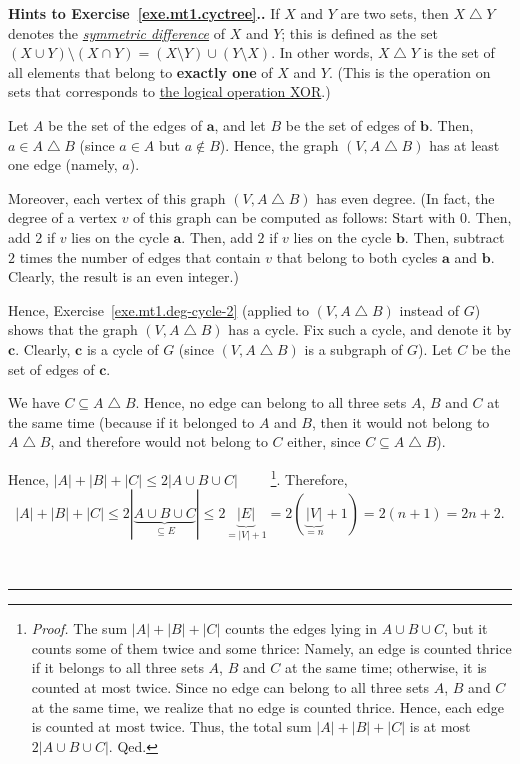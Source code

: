\documentclass[numbers=enddot,12pt,final,onecolumn,notitlepage]{scrartcl}%
\theoremstyle{definition}
\newenvironment{proof}[1][Proof]{\noindent\textbf{#1.} }{\ \rule{0.5em}{0.5em}}
\newenvironment{noncompile}{}{}
\newcommand{\abs}[1]{\left| #1 \right|}
\newcommand{\tup}[1]{\left( #1 \right)}
\begin{document}
\begin{noncompile}
\begin{proof}[Hints to Exercise~\ref{exe.mt1.cyctree}.]
If $X$ and $Y$ are two sets, then $X \bigtriangleup Y$ denotes the
\href{https://en.wikipedia.org/wiki/Symmetric_difference}{\textit{symmetric difference}}
of $X$ and $Y$; this is defined as the
set $\tup{X \cup Y} \setminus \tup{X \cap Y}
= \tup{X \setminus Y} \cup \tup{Y \setminus X}$. In other words,
$X \bigtriangleup Y$ is the set of all elements that belong to
\textbf{exactly one} of $X$ and $Y$. (This is the operation on sets
that corresponds to
\href{https://en.wikipedia.org/wiki/Exclusive_or}{the logical operation XOR}.)

Let $A$ be the set of the edges of $\mathbf{a}$, and let $B$ be the
set of edges of $\mathbf{b}$. Then, $a \in A \bigtriangleup B$ (since
$a \in A$ but $a \notin B$). Hence, the graph
$\tup{V, A \bigtriangleup B}$ has at least one edge (namely, $a$).

Moreover, each vertex of this graph
$\tup{V, A \bigtriangleup B}$ has even degree. (In fact, the degree
of a vertex $v$ of this graph can be computed as follows: Start with
$0$. Then, add $2$ if $v$ lies on the cycle $\mathbf{a}$. Then, add
$2$ if $v$ lies on the cycle $\mathbf{b}$. Then, subtract $2$ times
the number of edges that contain $v$ that belong to both cycles
$\mathbf{a}$ and $\mathbf{b}$. Clearly, the result is an even
integer.)

Hence, Exercise~\ref{exe.mt1.deg-cycle-2} (applied to
$\tup{V, A \bigtriangleup B}$ instead of $G$) shows that the graph
$\tup{V, A \bigtriangleup B}$ has a cycle. Fix such a cycle, and
denote it by $\mathbf{c}$. Clearly, $\mathbf{c}$ is a cycle of $G$
(since $\tup{V, A \bigtriangleup B}$ is a subgraph of $G$). Let $C$
be the set of edges of $\mathbf{c}$.

We have $C \subseteq A \bigtriangleup B$. Hence, no edge can belong
to all three sets $A$, $B$ and $C$ at the same time (because if it
belonged to $A$ and $B$, then it would not belong to
$A \bigtriangleup B$, and therefore would not belong to $C$ either,
since $C \subseteq A \bigtriangleup B$).

Hence,
$\abs{A} + \abs{B} + \abs{C} \leq 2 \abs{A \cup B \cup C}$
\ \ \ \ \footnote{\textit{Proof.} The sum
$\abs{A} + \abs{B} + \abs{C}$ counts the edges lying in
$A \cup B \cup C$, but it counts some of them twice and some thrice:
Namely, an edge is counted thrice if it belongs to all three sets
$A$, $B$ and $C$ at the same time;
otherwise, it is counted at most twice. Since no edge can belong to
all three sets $A$, $B$ and $C$ at the same time, we realize that no
edge is counted thrice. Hence, each edge is counted at most twice.
Thus, the total sum $\abs{A} + \abs{B} + \abs{C}$ is at most
$2 \abs{A \cup B \cup C}$. Qed.}. Therefore,
\[
\abs{A} + \abs{B} + \abs{C}
\leq 2 \abs{\underbrace{A \cup B \cup C}_{\subseteq E}}
\leq 2 \underbrace{\abs{E}}_{= \abs{V} + 1}
= 2 \tup{\underbrace{\abs{V}}_{= n} + 1}
= 2 \tup{n+1} = 2n+2.
\]


\end{proof}
\end{noncompile}
\end{document}

